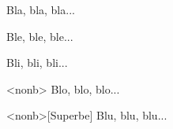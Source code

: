
Bla, bla, bla...

\begin{bdocexa}
    Ble, ble, ble...
\end{bdocexa}

\begin{bdocexa}[Magnifique]
    Bli, bli, bli...
\end{bdocexa}

\begin{bdocexa}<nonb>
    Blo, blo, blo...
\end{bdocexa}

\begin{bdocexa}<nonb>[Superbe]
    Blu, blu, blu...
\end{bdocexa}
